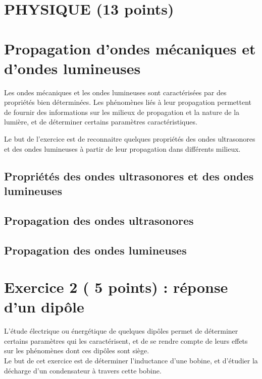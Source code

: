 \section*{PHYSIQUE (13 points)}

\section{Propagation d'ondes mécaniques et d'ondes lumineuses}
Les ondes mécaniques et les ondes lumineuses sont caractérisées par des
propriétés bien déterminées. Les phénomènes liés à leur propagation permettent
de fournir des informations sur les milieux de propagation et la nature de la
lumière, et de déterminer certains paramètres caractéristiques.

Le but de l'exercice est de reconnaitre quelques propriétés des ondes
ultrasonores et des ondes lumineuses à partir de leur propagation dans
différents milieux.

\subsection{Propriétés des ondes ultrasonores et des ondes lumineuses}


\subsection{Propagation des ondes ultrasonores}


\subsection{Propagation des ondes lumineuses}



\section*{Exercice 2 ( $\mathbf{5}$ points) : réponse d'un dipôle}
L'étude électrique ou énergétique de quelques dipôles permet de déterminer certains paramètres qui les caractérisent, et de se rendre compte de leurs effets sur les phénomènes dont ces dipôles sont siège.\\
Le but de cet exercice est de déterminer l'inductance d'une bobine, et d'étudier la décharge d'un condensateur à travers cette bobine.

